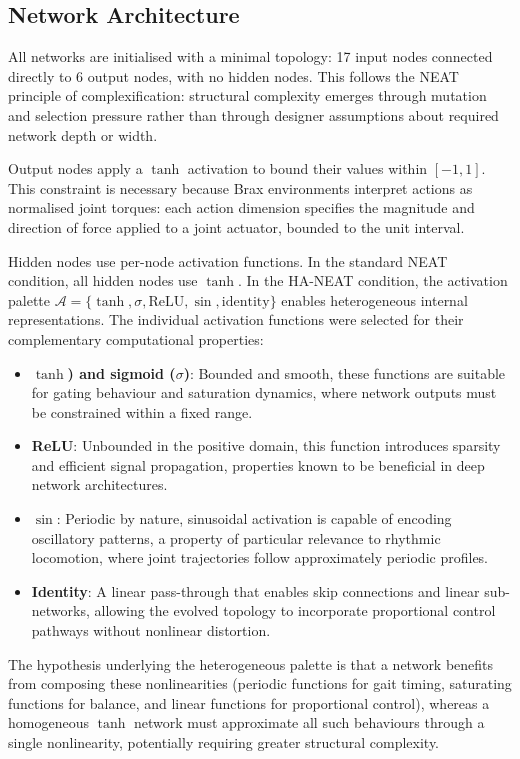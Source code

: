 \documentclass[12pt]{article}
\begin{document}
\subsection{Network Architecture}

All networks are initialised with a minimal topology: 17 input nodes connected directly to 6 output nodes, with no hidden nodes. This follows the NEAT principle of complexification: structural complexity emerges through mutation and selection pressure rather than through designer assumptions about required network depth or width.

Output nodes apply a $\tanh$ activation to bound their values within $[-1, 1]$. This constraint is necessary because Brax environments interpret actions as normalised joint torques: each action dimension specifies the magnitude and direction of force applied to a joint actuator, bounded to the unit interval.

Hidden nodes use per-node activation functions. In the standard NEAT condition, all hidden nodes use $\tanh$. In the HA-NEAT condition, the activation palette $\mathcal{A} = \{\tanh, \sigma, \text{ReLU}, \sin, \text{identity}\}$ enables heterogeneous internal representations. The individual activation functions were selected for their complementary computational properties:

\begin{itemize}
    \item \textbf{$\tanh$) and sigmoid ($\sigma$)}: Bounded and smooth, these functions are suitable for gating behaviour and saturation dynamics, where network outputs must be constrained within a fixed range.
    \item \textbf{ReLU}: Unbounded in the positive domain, this function introduces sparsity and efficient signal propagation, properties known to be beneficial in deep network architectures.
    \item \textbf{$\sin$}: Periodic by nature, sinusoidal activation is capable of encoding oscillatory patterns, a property of particular relevance to rhythmic locomotion, where joint trajectories follow approximately periodic profiles.
    \item \textbf{Identity}: A linear pass-through that enables skip connections and linear sub-networks, allowing the evolved topology to incorporate proportional control pathways without nonlinear distortion.
\end{itemize}

The hypothesis underlying the heterogeneous palette is that a network benefits from composing these nonlinearities (periodic functions for gait timing, saturating functions for balance, and linear functions for proportional control), whereas a homogeneous $\tanh$ network must approximate all such behaviours through a single nonlinearity, potentially requiring greater structural complexity.
\end{document}
